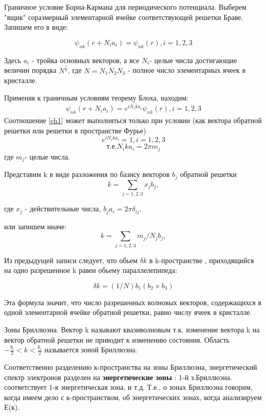 \documentclass[__main__.tex]{subfiles}
\begin{document}
\begin{definition}
	Граничное условие Борна-Кармана для периодического потенциала. Выберем "ящик" соразмерный элементарной ячейке соответствующей решетки Браве. Запишем его в виде:

$$\psi_{nk}(r+N_i a_i)=\psi_{nk}(r), i=1,2,3 $$

	Здесь $a_i$ - тройка основных векторов, а все $N_i$- целые числа достигающие величин порядка $N^{\frac{1}{3}} $, где $N=N_{1}N_{2}N_{3}$ - полное число элементарных ячеек в кристалле.
\end{definition}
	 Применяя к граничным условиям теорему Блоха, находим:\\
 \begin{gather}
	 	\label{ch1}
	 		\psi_{nk}(r+N_i a_i)=e^{iN_{i}ka_{i}} \psi_{nk}(r) ,i=1,2,3
	\end{gather}	 
Соотношение \ref{ch1} может выполняться только при условии (как вектора обратной решетки или решетки в пространстве Фурье)
$$	e^{iN_{i}ka_{i}}=1 ,i=1,2,3 $$
$$т.е. N_{i}ka_{i}=2\pi m_{j}$$
где $m_{j}$- целые числа.

Представим k в виде разложения по базису векторов $b_{j}$  обратной решетки 
$$k=\sum_{j=1,2,3}x_{j} b_{j},$$

где $x_{j}$ - действительные числа, $b_{j}a_{i}=2\pi \delta_{ij}.$

или запишем иначе:
$$k=\sum_{j=1,2,3}m_{j}/N_{j} b_{j},$$

Из предыдущей записи следует, что обьем $\delta k$ в k-пространстве , приходящийся на одно разрешенное k равен обьему параллелепипеда:

$$\delta k=(1/N)b_{1}(b_{2}\times b_{3})$$

Эта формула значит, что  число разрешенных волновых векторов, содержащихся в одной элементарной ячейке обратной решетки, равно числу ячеек в кристалле.



\begin{definition}
	Зоны Бриллюэна.
	Вектор k называют квазиволновым т.к. изменение вектора k на вектор обратной решетки не приводит к изменению состояния.
	Область $-\frac{b_{i}}{2}<k<\frac{b_{i}}{2}$ называется зоной Бриллюэна.
\end{definition}

Соответственно разделению к-пространства на зоны Бриллюэна, энергетический спектр электронов разделен на \textbf{энергетические зоны} : 1-й з.Бриллюэна. соответствует 1-я энергетическая зона, и т.д. Т.е., о зонах Бриллюэна говорим, когда имеем дело с к-пространством, об энергетических зонах, когда анализируем Е(к). 
\end{document}
